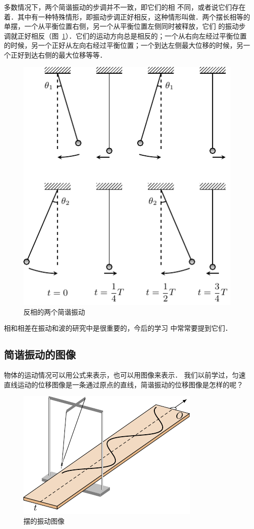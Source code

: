 多数情况下，两个简谐振动的步调并不一致，即它们的相
不同，或者说它们存在着．其中有一种特殊情形，即振动步调正好相反，这种情形叫做．两个摆长相等的单摆，一个从平衡位置右侧，另一个从平衡位置左侧同时被释放，它们
的振动步调就正好相反（图~\ref{fig_A_9-5}）．它们的运动方向总是相反的；一个从右向左经过平衡位置的时候，另一个正好从左向右经过平衡位置；一个到达左侧最大位移的时候，另一个正好到达右侧的最大位移等等．
\begin{figure}[htbp]
    \centering
    \includegraphics{fig/A/9-5.pdf}
    \caption{反相的两个简谐振动}\label{fig_A_9-5}
\end{figure}

相和相差在振动和波的研究中是很重要的，今后的学习
中常常要提到它们．

\subsection{简谐振动的图像}
物体的运动情况可以用公式来表示，也可以用图像来表示．
我们以前学过，匀速直线运动的位移图像是一条通过原点的直线，简谐振动的位移图像是怎样的呢？
\begin{figure}[htbp]
    \centering
    \includegraphics{fig/A/9-6.pdf}
    \caption{摆的振动图像}\label{fig_A_9-6}
\end{figure}

